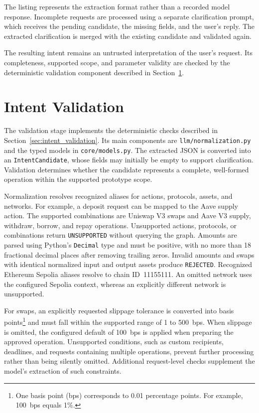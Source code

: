 The listing represents the extraction format rather than a
recorded model response. Incomplete requests are processed
using a separate clarification prompt, which receives the
pending candidate, the missing fields, and the user's reply.
The extracted clarification is merged with the existing
candidate and validated again.

The resulting intent remains an untrusted interpretation
of the user's request. Its completeness, supported scope,
and parameter validity are checked by the deterministic
validation component described in
Section~\ref{sec:intent_validation_implementation}.




\section{Intent Validation}
\label{sec:intent_validation_implementation}

The validation stage implements the deterministic checks
described in Section~\ref{sec:intent_validation}. Its main
components are \texttt{llm/normalization.py} and the typed
models in \texttt{core/models.py}. The extracted JSON is
converted into an \texttt{IntentCandidate}, whose fields may
initially be empty to support clarification. Validation
determines whether the candidate represents a complete,
well-formed operation within the supported prototype scope.

Normalization resolves recognized aliases for actions,
protocols, assets, and networks. For example, a deposit
request can be mapped to the Aave supply action. The
supported combinations are Uniswap V3 swaps and Aave V3
supply, withdraw, borrow, and repay operations. Unsupported
actions, protocols, or combinations return
\texttt{UNSUPPORTED} without querying the graph. Amounts are parsed using Python's \texttt{Decimal} type and
must be positive, with no more than 18 fractional decimal
places after removing trailing zeros. Invalid amounts and
swaps with identical normalized input and output assets
produce \texttt{REJECTED}. Recognized Ethereum Sepolia
aliases resolve to chain ID~11155111. An omitted network
uses the configured Sepolia context, whereas an explicitly
different network is unsupported.

For swaps, an explicitly requested slippage tolerance is
converted into basis points\footnote{One basis point (bps)
corresponds to 0.01 percentage points. For example,
100~bps equals 1\%.} and must fall within the supported
range of 1 to 500~bps. When slippage is omitted, the
configured default of 100~bps is applied when preparing
the approved operation. Unsupported conditions, such as
custom recipients, deadlines, and requests containing
multiple operations, prevent further processing rather
than being silently omitted. Additional request-level
checks supplement the model's extraction of such
constraints.

